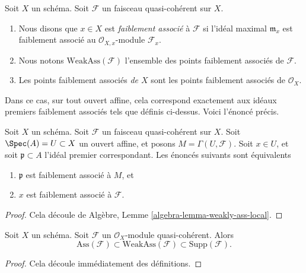 \begin{definition}
\label{definition-weakly-associated}
Soit  $X$  un schéma. Soit  $\mathcal{F}$  un faisceau quasi-cohérent sur
 $X$.
\begin{enumerate}
\item Nous disons que  $x \in X$  est  {\it faiblement
associé} à $\mathcal{F}$ si l'idéal maximal $\mathfrak m_x$ est faiblement
associé au $\mathcal{O}_{X, x}$-module $\mathcal{F}_x$.
\item Nous notons  $\text{WeakAss}(\mathcal{F})$  l'ensemble des points faiblement associés de
 $\mathcal{F}$.
\item Les points faiblement associés  {\it  de
 $X$}  sont les points faiblement associés de  $\mathcal{O}_X$.
\end{enumerate}
\end{definition}

\noindent
Dans ce cas, sur tout ouvert affine, cela correspond exactement aux idéaux
premiers faiblement associés tels que définis ci-dessus. Voici l'énoncé précis.

\begin{lemma}
\label{lemma-weakly-associated-affine-open}
Soit  $X$  un schéma. Soit  $\mathcal{F}$  un faisceau quasi-cohérent sur
 $X$. Soit  $\Spec(A) = U \subset X$  un ouvert affine, et posons  $M = \Gamma(U, \mathcal{F})$. Soit
 $x \in U$, et soit  $\mathfrak p \subset A$  l'idéal premier correspondant. Les énoncés suivants
sont équivalents
\begin{enumerate}
\item $\mathfrak p$  est faiblement associé à  $M$, et
\item $x$  est faiblement associé à  $\mathcal{F}$.
\end{enumerate}
\end{lemma}

\begin{proof}
Cela découle de Algèbre, Lemme  \ref{algebra-lemma-weakly-ass-local}.
\end{proof}

\begin{lemma}
\label{lemma-weakly-ass-support}
Soit  $X$  un schéma. Soit  $\mathcal{F}$  un  $\mathcal{O}_X$-module
quasi-cohérent. Alors
$$
\text{Ass}(\mathcal{F}) \subset \text{WeakAss}(\mathcal{F}) \subset
\text{Supp}(\mathcal{F}).
$$
\end{lemma}

\begin{proof}
Cela découle immédiatement des définitions.
\end{proof}

